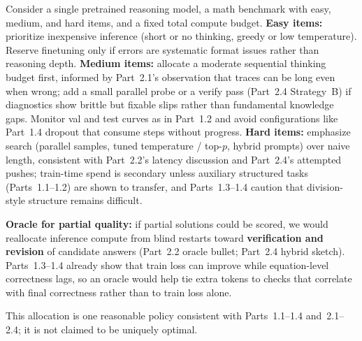 \documentclass[11pt]{article}
\begin{document}
Consider a single pretrained reasoning model, a math benchmark with easy, medium, and hard items, and a fixed total compute budget. \textbf{Easy items:} prioritize inexpensive inference (short or no thinking, greedy or low temperature). Reserve finetuning only if errors are systematic format issues rather than reasoning depth. \textbf{Medium items:} allocate a moderate sequential thinking budget first, informed by Part~2.1's observation that traces can be long even when wrong; add a small parallel probe or a verify pass (Part~2.4 Strategy~B) if diagnostics show brittle but fixable slips rather than fundamental knowledge gaps. Monitor val and test curves as in Part~1.2 and avoid configurations like Part~1.4 dropout that consume steps without progress. \textbf{Hard items:} emphasize search (parallel samples, tuned temperature / top-$p$, hybrid prompts) over naive length, consistent with Part~2.2's latency discussion and Part~2.4's attempted pushes; train-time spend is secondary unless auxiliary structured tasks (Parts~1.1--1.2) are shown to transfer, and Parts~1.3--1.4 caution that division-style structure remains difficult.

\textbf{Oracle for partial quality:} if partial solutions could be scored, we would reallocate inference compute from blind restarts toward \textbf{verification and revision} of candidate answers (Part~2.2 oracle bullet; Part~2.4 hybrid sketch). Parts~1.3--1.4 already show that train loss can improve while equation-level correctness lags, so an oracle would help tie extra tokens to checks that correlate with final correctness rather than to train loss alone.

This allocation is one reasonable policy consistent with Parts~1.1--1.4 and~2.1--2.4; it is not claimed to be uniquely optimal.
\end{document}
